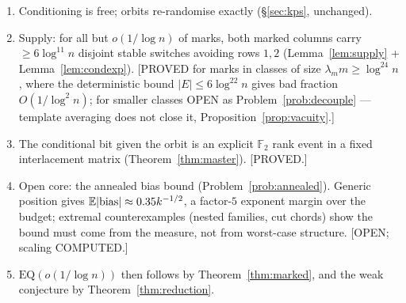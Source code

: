 \begin{enumerate}[leftmargin=2em]
\item Conditioning is free; orbits re-randomise exactly
(\S\ref{sec:kps}, unchanged).
\item Supply: for all but $o(1/\log n)$ of marks, both marked
columns carry $\ge6\log^{11}n$ disjoint stable switches avoiding
rows $1,2$ (Lemma~\ref{lem:supply} + Lemma~\ref{lem:condexp}).
[PROVED for marks in classes of size $\lambda_m m\ge\log^{24}n$,
where the deterministic bound $|E|\le6\log^{22}n$ gives bad fraction
$O(1/\log^2 n)$; for smaller classes OPEN as
Problem~\ref{prob:decouple} --- template averaging does not close
it, Proposition~\ref{prop:vacuity}.]
\item The conditional bit given the orbit is an explicit
$\mathbb{F}_2$ rank event in a fixed interlacement matrix
(Theorem~\ref{thm:master}).  [PROVED.]
\item Open core: the annealed bias bound
(Problem~\ref{prob:annealed}).  Generic position gives
$\mathbb{E}|\mathrm{bias}|\approx0.35k^{-1/2}$, a factor-$5$ exponent margin
over the budget; extremal counterexamples (nested families, cut
chords) show the bound must come from the measure, not from
worst-case structure.  [OPEN; scaling COMPUTED.]
\item $\mathrm{EQ}(o(1/\log n))$ then follows by
Theorem~\ref{thm:marked}, and the weak conjecture by
Theorem~\ref{thm:reduction}.
\end{enumerate}
